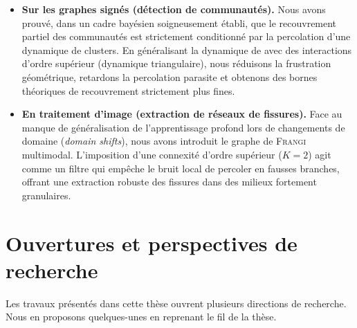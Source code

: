 \begin{enumerate}
    \begin{itemize}
        \item \textbf{Sur les graphes signés (détection de communautés).} Nous avons prouvé, dans un cadre bayésien soigneusement établi, que le recouvrement partiel des communautés est strictement conditionné par la percolation d'une dynamique de clusters. En généralisant la dynamique de \SW{} avec des interactions d'ordre supérieur (dynamique triangulaire), nous réduisons la frustration géométrique, retardons la percolation parasite et obtenons des bornes théoriques de recouvrement strictement plus fines. %
        \item \textbf{En traitement d'image (extraction de réseaux de fissures).} Face au manque de généralisation de l'apprentissage profond lors de changements de domaine (\emph{domain shifts}), nous avons introduit le graphe de \textsc{Frangi} multimodal. L'imposition d'une connexité d'ordre supérieur ($K=2$) agit comme un filtre qui empêche le bruit local de percoler en fausses branches, offrant une extraction robuste des fissures dans des milieux fortement granulaires.
    \end{itemize}
\end{enumerate}

\section{Ouvertures et perspectives de recherche}

Les travaux présentés dans cette thèse ouvrent plusieurs directions de recherche. Nous en proposons quelques-unes en reprenant le fil de la thèse.


